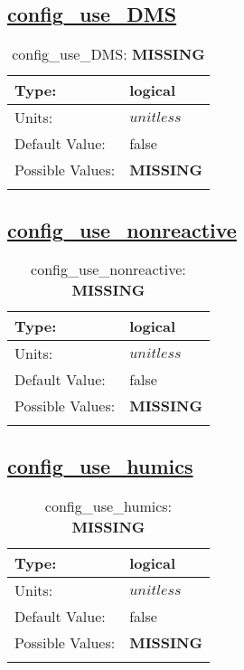 \subsection[config\_use\_DMS]{\hyperref[sec:nm_tab_biogeochemistry]{config\_use\_DMS}}
\label{subsec:nm_sec_config_use_DMS}
\begin{center}
\begin{longtable}{| p{2.0in} || p{4.0in} |}
    \hline
    Type: & logical \\
    \hline
    Units: & $unitless$ \\
    \hline
    Default Value: & false \\
    \hline
    Possible Values: & {\bf \color{red} MISSING} \\
    \hline
    \caption{config\_use\_DMS: {\bf \color{red} MISSING}}
\end{longtable}
\end{center}
\subsection[config\_use\_nonreactive]{\hyperref[sec:nm_tab_biogeochemistry]{config\_use\_nonreactive}}
\label{subsec:nm_sec_config_use_nonreactive}
\begin{center}
\begin{longtable}{| p{2.0in} || p{4.0in} |}
    \hline
    Type: & logical \\
    \hline
    Units: & $unitless$ \\
    \hline
    Default Value: & false \\
    \hline
    Possible Values: & {\bf \color{red} MISSING} \\
    \hline
    \caption{config\_use\_nonreactive: {\bf \color{red} MISSING}}
\end{longtable}
\end{center}
\subsection[config\_use\_humics]{\hyperref[sec:nm_tab_biogeochemistry]{config\_use\_humics}}
\label{subsec:nm_sec_config_use_humics}
\begin{center}
\begin{longtable}{| p{2.0in} || p{4.0in} |}
    \hline
    Type: & logical \\
    \hline
    Units: & $unitless$ \\
    \hline
    Default Value: & false \\
    \hline
    Possible Values: & {\bf \color{red} MISSING} \\
    \hline
    \caption{config\_use\_humics: {\bf \color{red} MISSING}}
\end{longtable}
\end{center}
